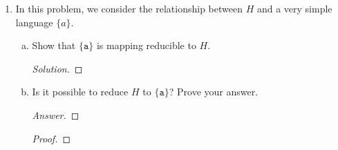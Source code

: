 \documentclass[10pt]{article}
\begin{document}
\begin{enumerate}[1)]
\begin{enumerate}[a)]
\item
Use the graph algorithm we describe to find a coloring of $G$.
\begin{proof}[Solution]
Start with $B$ and color each edge alternately.
\begin{align*}
Red &= \{(B, 1), (B, 4)\}\\
Blue &= \{(B, 3)\}
\end{align*}
Now do vertex $3$:
\begin{align*}
Red &= \{(B, 1), (B, 4), (A, 3)\}\\
Blue &= \{(B, 3)\}
\end{align*}
Now vertex $A$:
\begin{align*}
Red &= \{(B, 1), (B, 4), (A, 3)\}\\
Blue &= \{(B, 3), (A, 4)\}
\end{align*}
Now vertex $4$: (it has one of each already, so pick arbitrarily.)
\begin{align*}
Red &= \{(B, 1), (B, 4), (A, 3)\}\\
Blue &= \{(B, 3), (A, 4), (C, 4)\}
\end{align*}
And now the last edge:
\begin{align*}
Red &= \{(B, 1), (B, 4), (A, 3), (D, 2)\}\\
Blue &= \{(B, 3), (A, 4), (C, 4)\}
\end{align*}
\end{proof}
\end{enumerate}



\item
In this problem, we consider the relationship between $H$ and a very simple language $\{a\}$.
\begin{enumerate}[a)]

\item
Show that $\{\texttt{a}\}$ is mapping reducible to $H$.  
\begin{proof}[Solution]
\end{proof}

\item
Is it possible to reduce $H$ to $\{\texttt{a}\}$?  Prove your answer.
\begin{proof}[Answer]
\end{proof}
\begin{proof}[Proof]
\end{proof}
\end{enumerate}



\end{enumerate}
\end{document}
